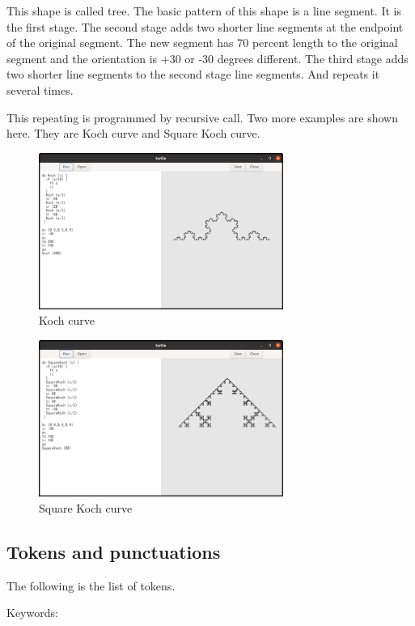 This shape is called tree. The basic pattern of this shape is a line
segment. It is the first stage. The second stage adds two shorter line
segments at the endpoint of the original segment. The new segment has 70
percent length to the original segment and the orientation is +30 or -30
degrees different. The third stage adds two shorter line segments to the
second stage line segments. And repeats it several times.

This repeating is programmed by recursive call. Two more examples are
shown here. They are Koch curve and Square Koch curve.

\begin{figure}
\centering
\includegraphics[width=8cm,height=5.11cm]{../src/turtle/image/turtle_koch.png}
\caption{Koch curve}
\end{figure}

\begin{figure}
\centering
\includegraphics[width=8cm,height=5.11cm]{../src/turtle/image/turtle_square_koch.png}
\caption{Square Koch curve}
\end{figure}

\subsection{Tokens and punctuations}\label{tokens-and-punctuations}

The following is the list of tokens.

Keywords:

